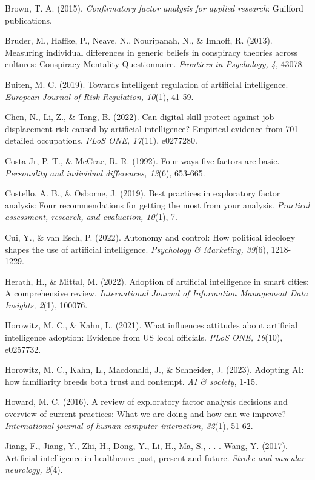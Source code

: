 Brown, T. A. (2015). \textit{Confirmatory factor analysis for applied research}: Guilford publications.

Bruder, M., Haffke, P., Neave, N., Nouripanah, N., \& Imhoff, R. (2013). Measuring individual differences in generic beliefs in conspiracy theories across cultures: Conspiracy Mentality Questionnaire. \textit{Frontiers in Psychology, 4}, 43078.

Buiten, M. C. (2019). Towards intelligent regulation of artificial intelligence. \textit{European Journal of Risk Regulation, 10}(1), 41-59.

Chen, N., Li, Z., \& Tang, B. (2022). Can digital skill protect against job displacement risk caused by artificial intelligence? Empirical evidence from 701 detailed occupations. \textit{PLoS ONE, 17}(11), e0277280.

Costa Jr, P. T., \& McCrae, R. R. (1992). Four ways five factors are basic. \textit{Personality and individual differences, 13}(6), 653-665.

Costello, A. B., \& Osborne, J. (2019). Best practices in exploratory factor analysis: Four recommendations for getting the most from your analysis. \textit{Practical assessment, research, and evaluation, 10}(1), 7.

Cui, Y., \& van Esch, P. (2022). Autonomy and control: How political ideology shapes the use of artificial intelligence. \textit{Psychology \& Marketing, 39}(6), 1218-1229.

Herath, H., \& Mittal, M. (2022). Adoption of artificial intelligence in smart cities: A comprehensive review. \textit{International Journal of Information Management Data Insights, 2}(1), 100076.

Horowitz, M. C., \& Kahn, L. (2021). What influences attitudes about artificial intelligence adoption: Evidence from US local officials. \textit{PLoS ONE, 16}(10), e0257732.

Horowitz, M. C., Kahn, L., Macdonald, J., \& Schneider, J. (2023). Adopting AI: how familiarity breeds both trust and contempt. \textit{AI \& society}, 1-15.

Howard, M. C. (2016). A review of exploratory factor analysis decisions and overview of current practices: What we are doing and how can we improve? \textit{International journal of human-computer interaction, 32}(1), 51-62.

Jiang, F., Jiang, Y., Zhi, H., Dong, Y., Li, H., Ma, S., . . . Wang, Y. (2017). Artificial intelligence in healthcare: past, present and future. \textit{Stroke and vascular neurology, 2}(4).

